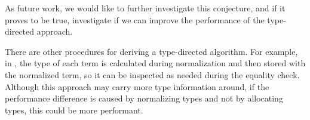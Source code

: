 As future work, we would like to further investigate this conjecture, and if it proves to be true, investigate if we can improve the performance of the type-directed approach.

There are other procedures for deriving a type-directed algorithm.
For example, in \citet{elabzoo}, the type of each term is calculated during normalization and then stored with the normalized term, so it can be inspected as needed during the equality check.
Although this approach may carry more type information around, if the performance difference is caused by normalizing types and not by allocating types, this could be more performant.

% 
% 
% 


